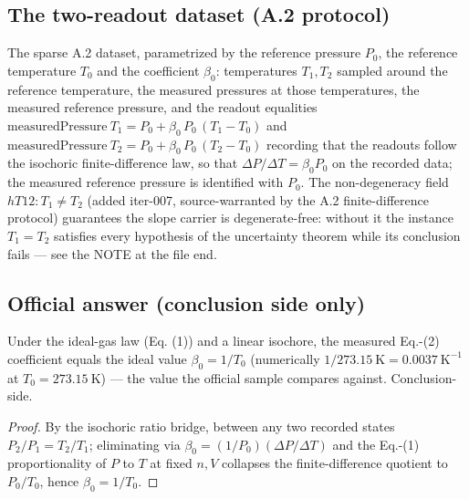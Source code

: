 \subsection*{The two-readout dataset (A.2 protocol)}

\begin{definition}
\label{def:IPhO2026Problems_problem_IPhO_2026_4_A_5:IsochoricReadout}
The sparse A.2 dataset, parametrized by the reference pressure $P_0$, the
reference temperature $T_0$ and the coefficient $\beta_0$: temperatures
$T_1, T_2$ sampled around the reference temperature, the measured
pressures at those temperatures, the measured reference pressure, and the
readout equalities
$\mathrm{measuredPressure}\ T_1 = P_0 + \beta_0\,P_0\,(T_1 - T_0)$ and
$\mathrm{measuredPressure}\ T_2 = P_0 + \beta_0\,P_0\,(T_2 - T_0)$
recording that the readouts follow the isochoric finite-difference law, so
that $\Delta P/\Delta T = \beta_0 P_0$ on the recorded data; the measured
reference pressure is identified with $P_0$.  The non-degeneracy field
$hT12 : T_1 \ne T_2$ (added iter-007, source-warranted by the A.2
finite-difference protocol) guarantees the slope carrier is
degenerate-free: without it the instance $T_1 = T_2$ satisfies every
hypothesis of the uncertainty theorem while its conclusion fails --- see
the NOTE at the file end.
\end{definition}

\subsection*{Official answer (conclusion side only)}

\begin{theorem}[A.5 ideal value: $\beta_0 = 1/T_0$]
\label{thm:IPhO2026Problems_problem_IPhO_2026_4_A_5:beta0_close_to_ideal}
Under the ideal-gas law (Eq. (1)) and a linear isochore, the measured
Eq.-(2) coefficient equals the ideal value $\beta_0 = 1/T_0$
(numerically $1/273.15\ \mathrm{K} = 0.0037\ \mathrm{K^{-1}}$ at
$T_0 = 273.15\ \mathrm{K}$) --- the value the official sample compares
against.  Conclusion-side.
\end{theorem}
\begin{proof}
By the isochoric ratio bridge, between any two recorded states
$P_2/P_1 = T_2/T_1$; eliminating via
$\beta_0 = (1/P_0)(\Delta P/\Delta T)$ and the Eq.-(1) proportionality of
$P$ to $T$ at fixed $n, V$ collapses the finite-difference quotient to
$P_0/T_0$, hence $\beta_0 = 1/T_0$.
\end{proof}

